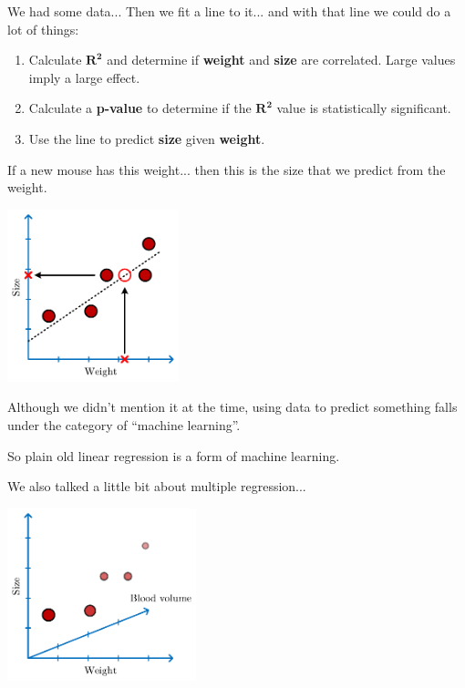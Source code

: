 \documentclass[
	final,
	a4paper,
	oneside,
	parskip=full,
	headings=standardclasses,
	headings=big,
	pointednumbers
]{scrartcl}
\newcommand{\tb}[1]{\textbf{#1}}
\begin{document}
    We had some data... Then we fit a line to it... and with that line we could do a lot of things:
    \begin{enumerate}[label=\arabic*)]
        \item{
            Calculate $\bm{R^2}$ and determine if \tb{weight} and \tb{size} are correlated.
            Large values imply a large effect.
        }
        \item{
            Calculate a \tb{p-value} to determine if the $\bm{R^2}$ value is
            statistically significant.
        }
        \item{
            Use the line to predict \tb{size} given \tb{weight}.
        }
    \end{enumerate}
    
    \newpage
    
    If a new mouse has this weight... then this is the size that we predict from the weight.

    \begin{center}
        \includegraphics[height=5cm]{StatQuest_Logistic_Regression_Mouse_Weight.pdf}
    \end{center}


    Although we didn't mention it at the time, using data to predict something falls under the
    category of ``machine learning''.

    So plain old linear regression is a form of machine learning.

    We also talked a little bit about multiple regression...

    \begin{center}
        \includegraphics[height=5cm]{StatQuest_Logistic_Regression_Weight_Size_Blood.pdf}
    \end{center}
\end{document}
